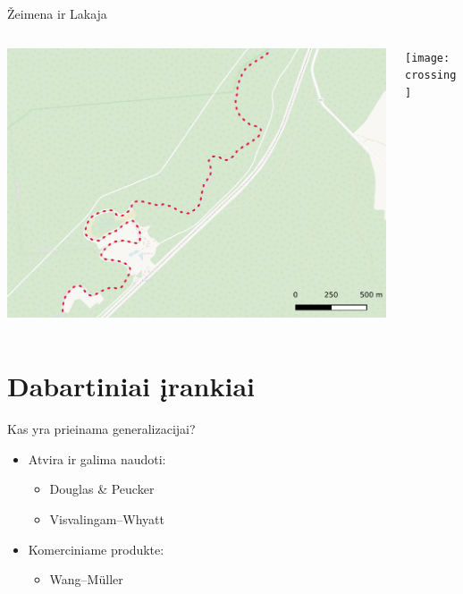 \documentclass[14pt]{beamer}
\newcommand{\DP}{Douglas \& Peucker}
\newcommand{\VW}{Visvalingam--Whyatt}
\newcommand{\WM}{Wang--M{\"u}ller}
\newcommand{\twocols}[2]
{
    \begin{columns}[c]
        \begin{column}{0.5\textwidth}
            #1
        \end{column}
        \hspace{0pt} \vrule{}
        \begin{column}{0.5\textwidth}
            #2
        \end{column}
    \end{columns}
}
\begin{document}
\begin{frame}{Žeimena ir Lakaja}
    \twocols
    {\includegraphics[width=\textwidth]{zeimena}}
    {\texttt{[image: crossing]}}
\end{frame}

\section{Dabartiniai įrankiai}
\begin{frame}{Kas yra prieinama generalizacijai?}
    \begin{itemize}[<+->]
        \item Atvira ir galima naudoti:
            \begin{itemize}[<+->]
                \item {\DP}
                \item {\VW}
            \end{itemize}
        \item Komerciniame produkte:
            \begin{itemize}[<+->]
                \item {\WM}
            \end{itemize}
    \end{itemize}
\end{frame}
\end{document}
